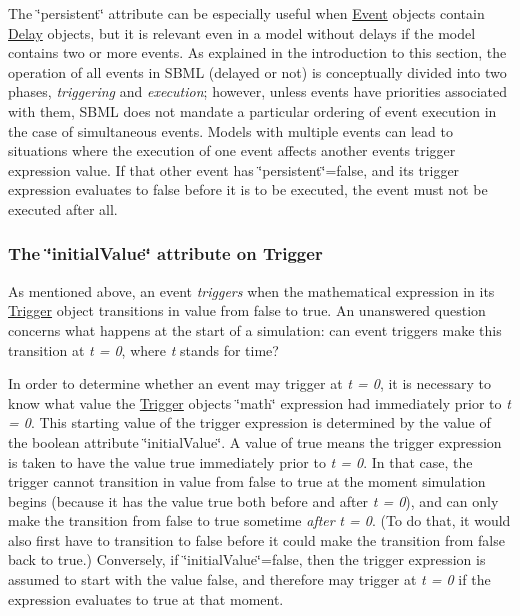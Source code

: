 The \char`\"{}persistent\char`\"{} attribute can be especially useful when \hyperlink{class_event}{Event} objects contain \hyperlink{class_delay}{Delay} objects, but it is relevant even in a model without delays if the model contains two or more events. As explained in the introduction to this section, the operation of all events in S\+B\+ML (delayed or not) is conceptually divided into two phases, {\itshape triggering} and {\itshape execution}; however, unless events have priorities associated with them, S\+B\+ML does not mandate a particular ordering of event execution in the case of simultaneous events. Models with multiple events can lead to situations where the execution of one event affects another event\textquotesingle{}s trigger expression value. If that other event has \char`\"{}persistent\char`\"{}={\ttfamily false}, and its trigger expression evaluates to {\ttfamily false} before it is to be executed, the event must not be executed after all.\hypertarget{class_trigger_trigger-initialvalue}{}\subsubsection{The \char`\"{}initial\+Value\char`\"{} attribute on Trigger}\label{class_trigger_trigger-initialvalue}
As mentioned above, an event {\itshape triggers} when the mathematical expression in its \hyperlink{class_trigger}{Trigger} object transitions in value from {\ttfamily false} to {\ttfamily true}. An unanswered question concerns what happens at the start of a simulation\+: can event triggers make this transition at {\itshape t = 0}, where {\itshape t} stands for time?

In order to determine whether an event may trigger at {\itshape t = 0}, it is necessary to know what value the \hyperlink{class_trigger}{Trigger} object\textquotesingle{}s \char`\"{}math\char`\"{} expression had immediately prior to {\itshape t = 0}. This starting value of the trigger expression is determined by the value of the boolean attribute \char`\"{}initial\+Value\char`\"{}. A value of {\ttfamily true} means the trigger expression is taken to have the value {\ttfamily true} immediately prior to {\itshape t = 0}. In that case, the trigger cannot transition in value from {\ttfamily false} to {\ttfamily true} at the moment simulation begins (because it has the value {\ttfamily true} both before and after {\itshape t = 0}), and can only make the transition from {\ttfamily false} to {\ttfamily true} sometime {\itshape after} {\itshape t = 0}. (To do that, it would also first have to transition to {\ttfamily false} before it could make the transition from {\ttfamily false} back to {\ttfamily true}.) Conversely, if \char`\"{}initial\+Value\char`\"{}={\ttfamily false}, then the trigger expression is assumed to start with the value {\ttfamily false}, and therefore may trigger at {\itshape t = 0} if the expression evaluates to {\ttfamily true} at that moment.

